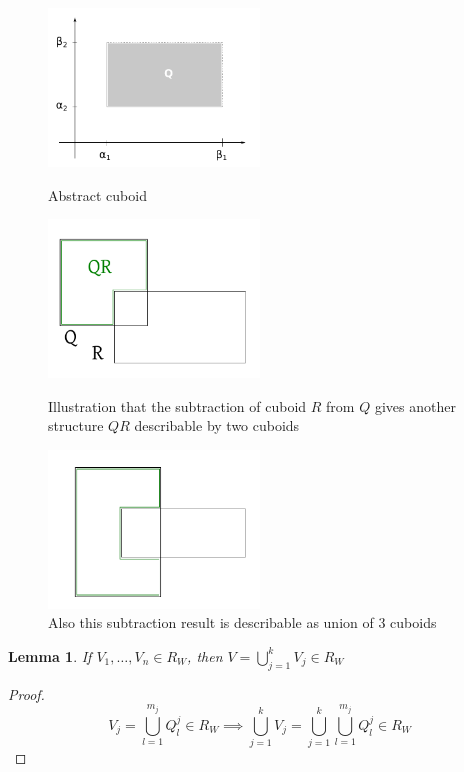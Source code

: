 \documentclass{article}
\newtheorem{lemma}{Lemma}  \numberwithin{lemma}{section}
\begin{document}
\begin{figure}[!h]
  \begin{center}
    \includegraphics[width=0.5\textwidth]{img/02_cuboid.pdf}
    \caption{Abstract cuboid}
    \label{img:cuboid}
  \end{center}
  \begin{center}
    \includegraphics[width=0.5\textwidth]{img/02_lemma1a.pdf}
    \caption{Illustration that the subtraction of cuboid $R$ from $Q$ gives another structure $QR$ describable by two cuboids}
    \label{img:lemma1a}
  \end{center}
  \begin{center}
    \includegraphics[width=0.5\textwidth]{img/02_lemma1b.pdf}
    \caption{Also this subtraction result is describable as union of 3 cuboids}
    \label{img:lemma1b}
  \end{center}
\end{figure}

\begin{lemma}
  \label{l:one}
  If $V_1,\ldots,V_n \in R_W$, then $V = \bigcup_{j=1}^k V_j \in R_W$
\end{lemma}
\begin{proof}
  \[ V_j = \bigcup_{l=1}^{m_j} Q_l^j \in R_W \implies \bigcup_{j=1}^k V_j = \bigcup_{j=1}^k \bigcup_{l=1}^{m_j} Q_l^j \in R_W \]
\end{proof}
\end{document}
